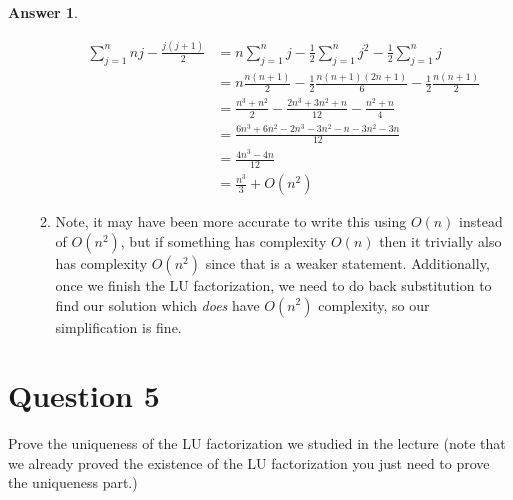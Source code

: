 \documentclass[10pt,a4paper]{article}
\theoremstyle{definition}
\newtheorem*{answer*}{Answer}
\theoremstyle{definition}
\numberwithin{equation}{section}
\begin{document}
\begin{answer*}
\begin{enumerate}[label = $\bullet$]
\begin{enumerate}[label = $\circ$]
	\begin{align*}
	\sum_{j = 1}^n nj - \frac{j(j+1)}{2} &= n \sum_{j = 1}^n j - \frac{1}{2} \sum_{j = 1}^n j^2 - \frac{1}{2} \sum_{j = 1}^n j\\
	&= n \frac{n(n+1)}{2} - \frac{1}{2} \frac{n(n+1)(2n+1)}{6} - \frac{1}{2} \frac{n(n+1)}{2}\\
	&= \frac{n^3 + n^2}{2} - \frac{2n^3 + 3n^2 + n}{12} - \frac{n^2 + n}{4}\\
	&= \frac{6n^3 + 6n^2 - 2n^3 - 3n^2 - n - 3n^2 - 3n}{12}\\
	&= \frac{4n^3 - 4n}{12}\\
	&= \frac{n^3}{3} + O(n^2)
	\end{align*}
	\item Note, it may have been more accurate to write this using $O(n)$ instead of $O(n^2)$, but if something has complexity $O(n)$ then it trivially also has complexity $O(n^2)$ since that is a weaker statement. Additionally, once we finish the LU factorization, we need to do back substitution to find our solution which \textit{does} have $O(n^2)$ complexity, so our simplification is fine. 
	\end{enumerate}
\end{enumerate}
\end{answer*}

\section*{Question 5}
Prove the uniqueness of the LU factorization we studied in the lecture (note that
we already proved the existence of the LU factorization you just need to prove the
uniqueness part.)
\end{document}
